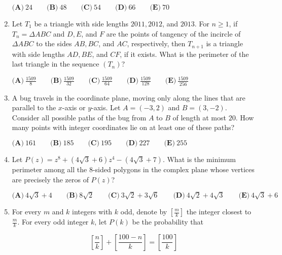 \documentclass{article}
\begin{document}
\begin{enumerate}[label=\arabic*., itemsep=0.5em]
\(\textbf{(A)}\ 24 \qquad \textbf{(B)}\ 48 \qquad \textbf{(C)}\ 54 \qquad \textbf{(D)}\ 66 \qquad \textbf{(E)}\ 70\)\par \vspace{0.5em}\item Let \(T_1\) be a triangle with side lengths \(2011, 2012\), and \(2013\). For \(n \geq 1\), if \(T_n = \Delta ABC\) and \(D, E\), and \(F\) are the points of tangency of the incircle of \(\Delta ABC\) to the sides \(AB, BC\), and \(AC\), respectively, then \(T_{n+1}\) is a triangle with side lengths \(AD, BE\), and \(CF\), if it exists. What is the perimeter of the last triangle in the sequence \(\left(T_n\right)\)?

\(\textbf{(A)}\ \frac{1509}{8} \qquad \textbf{(B)}\  \frac{1509}{32} \qquad \textbf{(C)}\  \frac{1509}{64} \qquad \textbf{(D)}\  \frac{1509}{128} \qquad \textbf{(E)}\  \frac{1509}{256}\)\par \vspace{0.5em}\item A bug travels in the coordinate plane, moving only along the lines that are parallel to the \(x\)-axis or \(y\)-axis. Let \(A = (-3, 2)\) and \(B = (3, -2)\). Consider all possible paths of the bug from \(A\) to \(B\) of length at most \(20\). How many points with integer coordinates lie on at least one of these paths?

\(\textbf{(A)}\ 161 \qquad \textbf{(B)}\ 185 \qquad \textbf{(C)}\  195 \qquad \textbf{(D)}\  227 \qquad \textbf{(E)}\  255\)\par \vspace{0.5em}\item Let \(P(z) = z^8 + \left(4\sqrt{3} + 6\right)z^4 - \left(4\sqrt{3} + 7\right)\). What is the minimum perimeter among all the \(8\)-sided polygons in the complex plane whose vertices are precisely the zeros of \(P(z)\)?

\(\textbf{(A)}\ 4\sqrt{3} + 4 \qquad \textbf{(B)}\ 8\sqrt{2} \qquad \textbf{(C)}\  3\sqrt{2} + 3\sqrt{6} \qquad \textbf{(D)}\  4\sqrt{2} + 4\sqrt{3} \qquad \textbf{(E)}\  4\sqrt{3} + 6\)\par \vspace{0.5em}\item For every \(m\) and \(k\) integers with \(k\) odd, denote by \(\left[\frac{m}{k}\right]\) the integer closest to \(\frac{m}{k}\). For every odd integer \(k\), let \(P(k)\) be the probability that


\begin{equation*}
\left[\frac{n}{k}\right] + \left[\frac{100 - n}{k}\right] = \left[\frac{100}{k}\right]
\end{equation*}



\end{enumerate}
\end{document}
